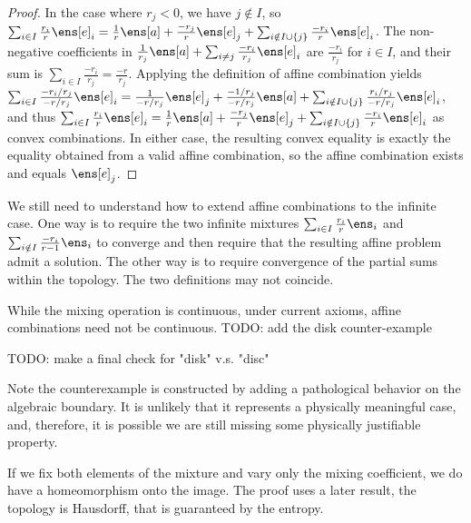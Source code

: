 \begin{mathSection}
\begin{proof}
	In the case where $r_j < 0$, we have $j \notin I$, so $\sum_{i \in I}\frac{r_i}{r}\ens[e]_i = \frac{1}{r}\ens[a] + \frac{-r_j}{r}\ens[e]_j + \sum_{i \notin I \cup \{j\}}\frac{-r_i}{r}\ens[e]_i$. The non-negative coefficients in $\frac{1}{r_j}\ens[a] + \sum_{i \ne j} \frac{-r_i}{r_j}\ens[e]_i$ are $\frac{-r_i}{r_j}$ for $i \in I$, and their sum is $\sum_{i \in I} \frac{-r_i}{r_j} = \frac{-r}{r_j}$. Applying the definition of affine combination yields $\sum_{i \in I} \frac{-r_i / r_j}{-r / r_j}\ens[e]_i = \frac{1}{-r / r_j}\ens[e]_j + \frac{-1 / r_j}{-r / r_j}\ens[a] + \sum_{i \notin I \cup \{j\}} \frac{r_i / r_j}{-r / r_j}\ens[e]_i$, and thus $\sum_{i \in I} \frac{r_i}{r}\ens[e]_i = \frac{1}{r}\ens[a] + \frac{-r_j}{r}\ens[e]_j + \sum_{i \notin I \cup \{j\}} \frac{-r_i}{r}\ens[e]_i$ as convex combinations. In either case, the resulting convex equality is exactly the equality obtained from a valid affine combination, so the affine combination exists and equals $\ens[e]_j$.
\end{proof}
\end{mathSection}

We still need to understand how to extend affine combinations to the infinite case. One way is to require the two infinite mixtures $\sum_{i \in I} \frac{r_i}{r} \ens_i$ and $\sum_{i \notin I} \frac{-r_i}{r-1} \ens_i$ to converge and then require that the resulting affine problem admit a solution. The other way is to require convergence of the partial sums within the topology. The two definitions may not coincide.

While the mixing operation is continuous, under current axioms, affine combinations need not be continuous. TODO: add the disk counter-example

TODO: make a final check for "disk" v.s. "disc"

Note the counterexample is constructed by adding a pathological behavior on the algebraic boundary. It is unlikely that it represents a physically meaningful case, and, therefore, it is possible we are still missing some physically justifiable property.

If we fix both elements of the mixture and vary only the mixing coefficient, we do have a homeomorphism onto the image. The proof uses a later result, the topology is Hausdorff, that is guaranteed by the entropy.

